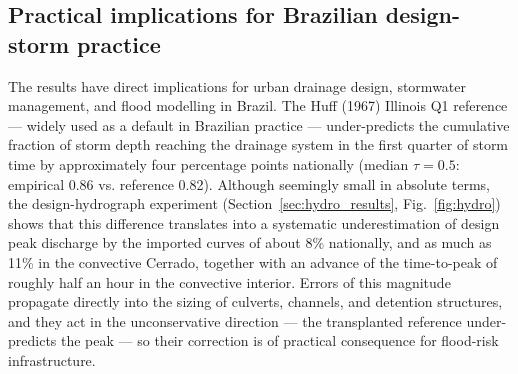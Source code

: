 \documentclass[a4paper,fleqn]{cas-sc}
\begin{document}
\subsection{Practical implications for Brazilian design-storm practice}

The results have direct implications for urban drainage design,
stormwater management, and flood modelling in Brazil. The Huff (1967)
Illinois Q1 reference — widely used as a default in Brazilian practice
— under-predicts the cumulative fraction of storm depth reaching the
drainage system in the first quarter of storm time by approximately
four percentage points nationally (median $\tau = 0.5$: empirical
0.86 vs. reference 0.82). Although seemingly small in absolute terms,
the design-hydrograph experiment (Section~\ref{sec:hydro_results},
Fig.~\ref{fig:hydro}) shows that this difference translates into a
systematic underestimation of design peak discharge by the imported
curves of about 8\% nationally, and as much as 11\% in the convective
Cerrado, together with an advance of the time-to-peak of roughly half
an hour in the convective interior. Errors of this magnitude propagate
directly into the sizing of culverts, channels, and detention
structures, and they act in the unconservative direction — the
transplanted reference under-predicts the peak — so their correction is
of practical consequence for flood-risk infrastructure.
\end{document}
